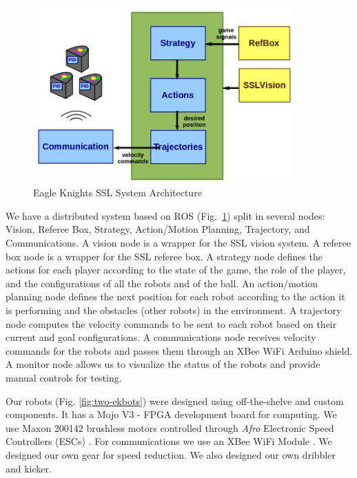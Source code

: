 \documentclass[]{llncs}
\newcommand{\TODO}[1]{{\textcolor{blue}{ToDo: {#1}}}}
\begin{document}
\begin{figure}[htb]
	\centering
	\includegraphics[width=10cm]{./pictures/eagle_knights_architecture.png}
	\caption{Eagle Knights SSL System Architecture}
	\label{fig:eagle-knights-architecture}  
\end{figure}


We have a distributed system based on ROS (Fig.~\ref{fig:eagle-knights-architecture}) split in several nodes: Vision, Referee Box, Strategy, Action/Motion Planning, Trajectory, and Communications. A vision node is a wrapper for the SSL vision system. A referee box node is a wrapper for the SSL referee box. A strategy node defines the actions for each player  according to the state of the game, the role of the player, and the configurations of all the robots and of the ball. An action/motion planning node defines the next position for each robot according to the action it is performing and the obstacles (other robots) in the environment. A trajectory node computes the velocity commands to be sent to each robot based on their current and goal configurations. A communications node receives velocity commands for the robots and passes them through an XBee WiFi Arduino shield. A monitor node allows us to visualize the status of the robots and provide manual controls for testing.


Our robots (Fig. \ref{fig:two-ekbots}) were designed using
off-the-shelve and custom components. It has a Mojo V3 - FPGA development board \cite{embedded micro} for computing. We use Maxon 200142 brushless motors \cite{maxon_motor} controlled through \emph{Afro} Electronic Speed Controllers (ESCs) \cite{esc_afro}. For communications we use an XBee WiFi Module \cite{xbee_wifi}. We designed our own gear for speed reduction. We also designed our own dribbler and kicker. 
\end{document}
